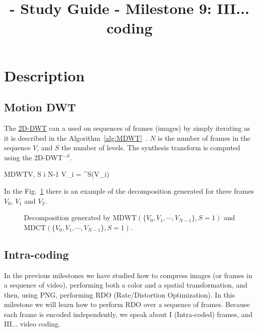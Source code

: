 
\title{\SM{} - Study Guide - Milestone 9: III... coding}

\maketitle

\tableofcontents

\section{Description}

\subsection{Motion DWT}

The
\href{https://sistemas-multimedia.github.io/milestones/06-2D-DWT/}{2D-DWT}
can a used on sequences of frames (images) by simply iterating as it
is described in the
Algorithm~\ref{alg:MDWT}~\cite{taubman2002jpeg2000}. $N$ is the number
of frames in the sequence $V$, and $S$ the number of levels. The
synthesis transform is computed using the 2D-DWT$^{-S}$.

\begin{pseudocode}{$\text{MDWT}$}{V, S}
  \label{alg:MDWT}
  \FOR i  \TO N-1 \DO
  V_i = ^S(V_i)
\end{pseudocode}

In the Fig.~\ref{fig:MDWT} there is an example of the decomposition
generated for three frames $V_0$, $V_1$ and $V_2$.

\begin{figure}
  \centering
  \caption{Decomposition generated by $\text{MDWT}(\{V_0, V_1, \cdots, V_{N-1}\}, S=1)$ and $\text{MDCT}(\{V_0, V_1, \cdots, V_{N-1}\}, S=1)$.}
  \label{fig:MDWT}
\end{figure}

\subsection{Intra-coding}

In the previous milestones we have studied how to compress images (or
frames in a sequence of video), performing both a color and a spatial
transformation, and then, using PNG, performing RDO (Rate/Distortion
Optimization). In this milestone we will learn how to perform RDO over
a sequence of frames. Because each frame is encoded independently, we
speak about I (Intra-coded) frames, and III... video coding.

